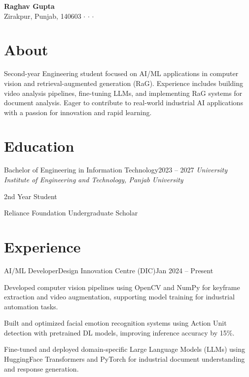 \documentclass[10pt, letterpaper]{article}
\newcommand{\contactdivider}{\hspace{0.2cm}$\cdot$\hspace{0.2cm}}
\newcommand{\headernamestyle}[1]{{\fontsize{28pt}{32pt}\selectfont\textbf{#1}}}
\begin{document}
\begin{center}
    \headernamestyle{Raghav Gupta}\\[0.25cm]
    \footnotesize
    {\faMapMarker*} Zirakpur, Punjab, 140603 \contactdivider
     \contactdivider
     \contactdivider
\end{center}

\section{About}
\begin{minipage}{\linewidth}
Second-year Engineering student focused on AI/ML applications in computer vision and retrieval-augmented generation (RaG). Experience includes building video analysis pipelines, fine-tuning LLMs, and implementing RaG systems for document analysis. Eager to contribute to real-world industrial AI applications with a passion for innovation and rapid learning.
\end{minipage}

\section{Education}
\begin{educationentry}{Bachelor of Engineering in Information Technology}{2023 -- 2027}
\textit{University Institute of Engineering and Technology, Panjab University}
\begin{achievementlist}
    \item 2nd Year Student
    \item Reliance Foundation Undergraduate Scholar
\end{achievementlist}
\end{educationentry}

\section{Experience}
\begin{experienceentry}{AI/ML Developer}{Design Innovation Centre (DIC)}{Jan 2024 -- Present}
    \item Developed computer vision pipelines using OpenCV and NumPy for keyframe extraction and video augmentation, supporting model training for industrial automation tasks.
    \item Built and optimized facial emotion recognition systems using Action Unit detection with pretrained DL models, improving inference accuracy by 15\%.
    \item Fine-tuned and deployed domain-specific Large Language Models (LLMs) using HuggingFace Transformers and PyTorch for industrial document understanding and response generation.
\end{experienceentry}
\end{document}
